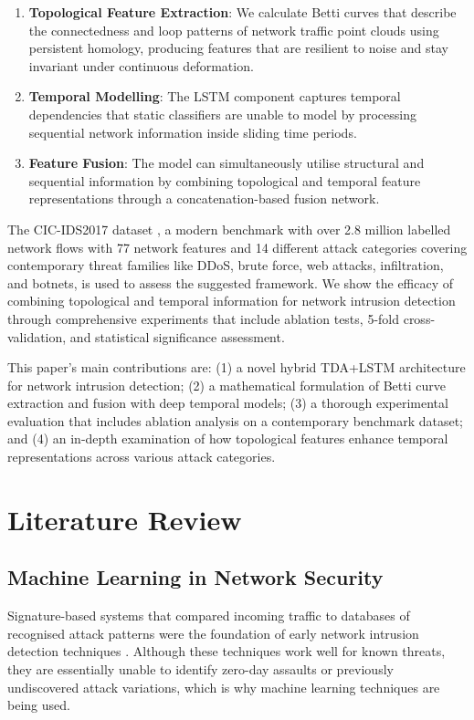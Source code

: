 \documentclass[conference]{IEEEtran}
\begin{document}
\begin{enumerate}
\item \textbf{Topological Feature Extraction}: We calculate Betti curves that describe the connectedness and loop patterns of network traffic point clouds using persistent homology, producing features that are resilient to noise and stay invariant under continuous deformation.
\item \textbf{Temporal Modelling}: The LSTM component captures temporal dependencies that static classifiers are unable to model by processing sequential network information inside sliding time periods.
\item \textbf{Feature Fusion}: The model can simultaneously utilise structural and sequential information by combining topological and temporal feature representations through a concatenation-based fusion network.
\end{enumerate}

The CIC-IDS2017 dataset \cite{ref11}, a modern benchmark with over 2.8 million labelled network flows with 77 network features and 14 different attack categories covering contemporary threat families like DDoS, brute force, web attacks, infiltration, and botnets, is used to assess the suggested framework. We show the efficacy of combining topological and temporal information for network intrusion detection through comprehensive experiments that include ablation tests, 5-fold cross-validation, and statistical significance assessment.

This paper's main contributions are: (1) a novel hybrid TDA+LSTM architecture for network intrusion detection; (2) a mathematical formulation of Betti curve extraction and fusion with deep temporal models; (3) a thorough experimental evaluation that includes ablation analysis on a contemporary benchmark dataset; and (4) an in-depth examination of how topological features enhance temporal representations across various attack categories.

 

\section{Literature Review}

\subsection{Machine Learning in Network Security}

Signature-based systems that compared incoming traffic to databases of recognised attack patterns were the foundation of early network intrusion detection techniques \cite{ref1}. Although these techniques work well for known threats, they are essentially unable to identify zero-day assaults or previously undiscovered attack variations, which is why machine learning techniques are being used.
\end{document}
